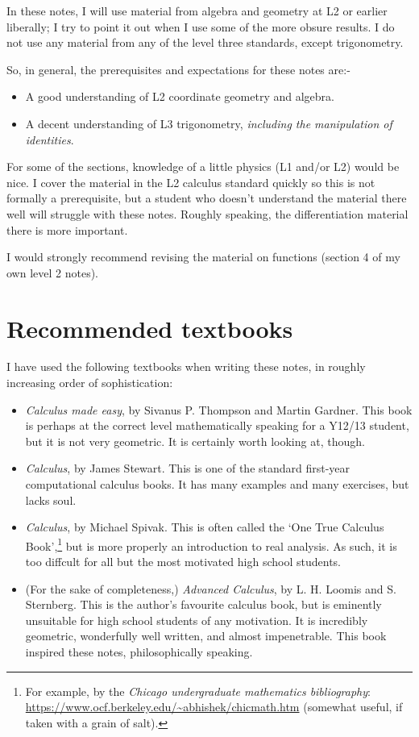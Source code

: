 \documentclass[a4paper]{memoir}
\theoremstyle{definition}
\begin{document}
In these notes, I will use material from algebra and geometry at L2 or earlier liberally;
I try to point it out when I use some of the more obsure results. I do not use any
material from any of the level three standards, except trigonometry.

So, in general, the prerequisites and expectations for these notes are:-
\begin{itemize}
  \item A good understanding of L2 coordinate geometry and algebra.
  \item A decent understanding of L3 trigonometry, \emph{including the manipulation of identities}.
\end{itemize}

For some of the sections, knowledge of a little physics (L1 and/or L2) would be nice. I cover
the material in the L2 calculus standard quickly so this is not formally a prerequisite, but a student
who doesn't understand the material there well will struggle with these notes. Roughly speaking,
the differentiation material there is more important.

I would strongly recommend revising the material on functions (section 4 of my own level 2 notes).

\section{Recommended textbooks}
I have used the following textbooks when writing these notes, in roughly increasing order of sophistication:
\begin{itemize}
  \item \emph{Calculus made easy}, by Sivanus P. Thompson and Martin Gardner. This book is perhaps at the correct level mathematically speaking
        for a Y12/13 student, but it is not very geometric. It is certainly worth looking at, though.
  \item \emph{Calculus}, by James Stewart. This is one of the standard first-year computational calculus books. It has many examples and many exercises,
        but lacks soul.
  \item \emph{Calculus}, by Michael Spivak. This is often called the `One True Calculus Book',\footnote{For example, by the \emph{Chicago undergraduate
        mathematics bibliography}: \url{https://www.ocf.berkeley.edu/~abhishek/chicmath.htm} (somewhat useful, if taken with a grain of salt).} but
        is more properly an introduction to real analysis. As such, it is too diffcult for all but the most motivated high school students.
  \item (For the sake of completeness,) \emph{Advanced Calculus}, by L. H. Loomis and S. Sternberg. This is the author's favourite calculus
        book, but is eminently unsuitable for high school students of any motivation. It is incredibly geometric, wonderfully well written, and
        almost impenetrable. This book inspired these notes, philosophically speaking.
\end{itemize}
\end{document}

